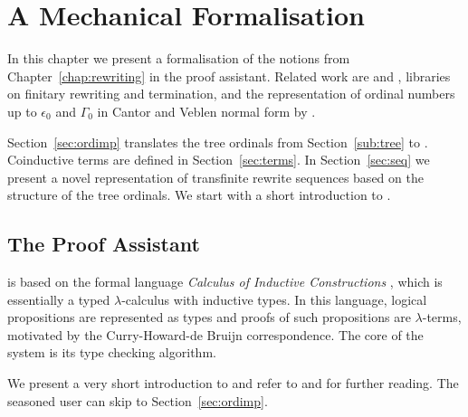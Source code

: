 \chapter{A Mechanical Formalisation}\label{chap:implementation}

In this chapter we present a formalisation of the notions from
Chapter~\ref{chap:rewriting} in the \Coq proof assistant. Related work
are \CoLoR \citep{blanqui-koprowski-10} and \Coccinelle
\citep{contejean-07}, libraries on finitary rewriting and termination,
and the representation of ordinal numbers up to $\epsilon_0$ and
$\Gamma_0$ in Cantor and Veblen normal form by \citet{casteran-06}.



Section~\ref{sec:ordimp} translates the
tree ordinals from Section~\ref{sub:tree} to \Coq. Coinductive
terms are defined in Section~\ref{sec:terms}. In Section~\ref{sec:seq}
we present a novel representation of transfinite rewrite sequences
based on the structure of the tree ordinals. We start with a short
introduction to \Coq. %


\section{The \Coq Proof Assistant}\label{sec:coq}


\Coq \citep{coq-refman-09} is based on the formal
language \emph{Calculus of Inductive Constructions}
\citep{coquand-huet-88,mohring-93}, which is essentially a typed
$\lambda$-calculus with inductive types. In this language, logical
propositions are represented as types and proofs of such propositions
are $\lambda$-terms, motivated by the Curry-Howard-de Bruijn
correspondence. The core of the \Coq system is its type checking
algorithm.

We present a very short introduction to \Coq and refer to
\citet{bertot-casteran-04} and \citet{chlipala-09} for further
reading. The seasoned \Coq user can skip to Section~\ref{sec:ordimp}.


